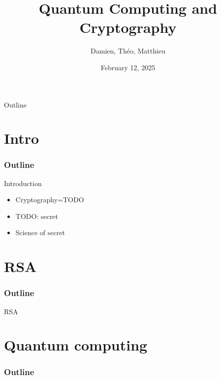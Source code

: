 \documentclass{beamer}
\title{Quantum Computing and Cryptography}
\author{Damien, Théo, Matthieu}
\institute{}
\date{February 12, 2025}
\begin{document}
\begin{frame}
\maketitle
\end{frame}

\begin{frame}{Outline}
\tableofcontents
\end{frame}

\section{Intro}
\begin{frame}
  \frametitle{Outline}
  \tableofcontents[currentsection]
\end{frame}

\begin{frame}{Introduction}
\begin{linenumbers}
	\begin{itemize}
		\item Cryptography=TODO
		\item TODO: secret
		\item<2->[$\rightarrow$] Science of secret
	\end{itemize}
\end{linenumbers}
\end{frame}

\section{RSA}
\begin{frame}
  \frametitle{Outline}
  \tableofcontents[currentsection]
\end{frame}

\begin{frame}{RSA}
\begin{linenumbers}

\end{linenumbers}
\end{frame}

\section{Quantum computing}
\begin{frame}
  \frametitle{Outline}
  \tableofcontents[currentsection]
\end{frame}
\end{document}
